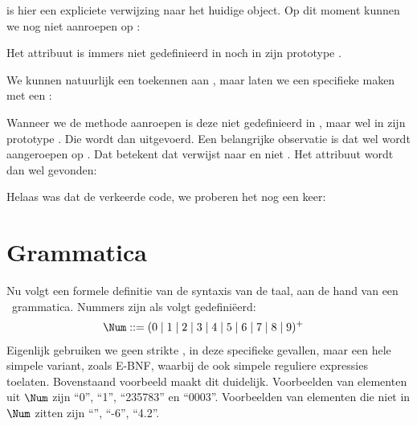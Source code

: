 
 is hier een expliciete verwijzing naar het huidige object. Op dit moment kunnen we  nog niet aanroepen op :


Het attribuut  is immers niet gedefinieerd in  noch in zijn prototype .

We kunnen natuurlijk een  toekennen aan , maar laten we een specifieke  maken met een :


Wanneer we de methode  aanroepen is deze niet gedefinieerd in , maar wel in zijn prototype . Die wordt dan uitgevoerd. Een belangrijke observatie is dat  wel wordt aangeroepen op . Dat betekent dat  verwijst naar  en niet . Het attribuut  wordt dan wel gevonden:


Helaas was dat de verkeerde code, we proberen het nog een keer:



\section{Grammatica}

Nu volgt een formele definitie van de syntaxis van de taal, aan de hand van een \BNF\ grammatica. Nummers zijn als volgt gedefiniëerd:
\begin{align*}
  \Num \GrammarDef (0 \mid 1 \mid 2 \mid 3 \mid 4 \mid 5 \mid 6 \mid 7 \mid 8 \mid 9)^+
\end{align*}
Eigenlijk gebruiken we geen strikte \BNF, in deze specifieke gevallen, maar een hele simpele variant, zoals \textsc{E-BNF}, waarbij de ook simpele reguliere expressies toelaten.%
Bovenstaand voorbeeld maakt dit duidelijk. Voorbeelden van elementen uit $\Num$ zijn ``0'', ``1'', ``235783'' en ``0003''. Voorbeelden van elementen die niet in $\Num$ zitten zijn ``'', ``-6'', ``4.2''.

